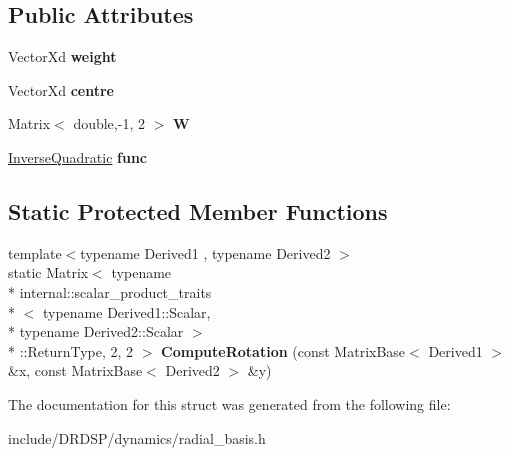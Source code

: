 \subsection*{Public Attributes}
\begin{DoxyCompactItemize}
\item 
\hypertarget{struct_d_r_d_s_p_1_1_equi_r_b_f_s_o2_3_01_inverse_quadratic_01_4_aa214df28e0d7bfbc87251e424b9f649a}{Vector\-Xd {\bfseries weight}}\label{struct_d_r_d_s_p_1_1_equi_r_b_f_s_o2_3_01_inverse_quadratic_01_4_aa214df28e0d7bfbc87251e424b9f649a}

\item 
\hypertarget{struct_d_r_d_s_p_1_1_equi_r_b_f_s_o2_3_01_inverse_quadratic_01_4_ab729533d926eff8fe2e83db3326b3665}{Vector\-Xd {\bfseries centre}}\label{struct_d_r_d_s_p_1_1_equi_r_b_f_s_o2_3_01_inverse_quadratic_01_4_ab729533d926eff8fe2e83db3326b3665}

\item 
\hypertarget{struct_d_r_d_s_p_1_1_equi_r_b_f_s_o2_3_01_inverse_quadratic_01_4_a219626fd7be7c1273f6700ef099d3e74}{Matrix$<$ double,-\/1, 2 $>$ {\bfseries W}}\label{struct_d_r_d_s_p_1_1_equi_r_b_f_s_o2_3_01_inverse_quadratic_01_4_a219626fd7be7c1273f6700ef099d3e74}

\item 
\hypertarget{struct_d_r_d_s_p_1_1_equi_r_b_f_s_o2_3_01_inverse_quadratic_01_4_a176501afd75e5ee20dac8c33a709dcf1}{\hyperlink{struct_d_r_d_s_p_1_1_inverse_quadratic}{Inverse\-Quadratic} {\bfseries func}}\label{struct_d_r_d_s_p_1_1_equi_r_b_f_s_o2_3_01_inverse_quadratic_01_4_a176501afd75e5ee20dac8c33a709dcf1}

\end{DoxyCompactItemize}
\subsection*{Static Protected Member Functions}
\begin{DoxyCompactItemize}
\item 
\hypertarget{struct_d_r_d_s_p_1_1_equi_r_b_f_s_o2_3_01_inverse_quadratic_01_4_a690f78667c7e93ae1ef26c099f5be79f}{{\footnotesize template$<$typename Derived1 , typename Derived2 $>$ }\\static Matrix$<$ typename \\*
internal\-::scalar\-\_\-product\-\_\-traits\\*
$<$ typename Derived1\-::\-Scalar, \\*
typename Derived2\-::\-Scalar $>$\\*
\-::Return\-Type, 2, 2 $>$ {\bfseries Compute\-Rotation} (const Matrix\-Base$<$ Derived1 $>$ \&x, const Matrix\-Base$<$ Derived2 $>$ \&y)}\label{struct_d_r_d_s_p_1_1_equi_r_b_f_s_o2_3_01_inverse_quadratic_01_4_a690f78667c7e93ae1ef26c099f5be79f}

\end{DoxyCompactItemize}


The documentation for this struct was generated from the following file\-:\begin{DoxyCompactItemize}
\item 
include/\-D\-R\-D\-S\-P/dynamics/radial\-\_\-basis.\-h\end{DoxyCompactItemize}
